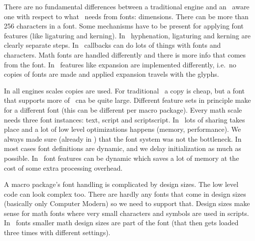 \stoptitle

\starttitle[title=\UNICODE\ engines]

\startitemize
    \startitem
        There are no fundamental differences between a traditional engine and an
        \UNICODE\ aware one with respect to what \TEX\ needs from fonts:
        dimensions.
    \stopitem
    \startitem
        There can be more than 256 characters in a font.
    \stopitem
    \startitem
        Some mechanisms have to be present for applying font features (like ligaturing and
        kerning).
    \stopitem
    \startitem
        In \LUATEX\ hyphenation, ligaturing and kerning are clearly separate steps.
    \stopitem
    \startitem
        In \LUATEX\ callbacks can do lots of things with fonts and characters.
    \stopitem
    \startitem
        Math fonts are handled differently and there is more info that comes from the font.
    \stopitem
    \startitem
        In \LUATEX\ features like expansion are implemented differently, i.e.\ no
        copies of fonts are made and applied expansion travels with the glyphs.
    \stopitem
\stopitemize

\stoptitle

\starttitle[title=Overhead]

\startitemize
    \startitem
        In all engines scales copies are used. For traditional \TEX\ a copy is cheap, but a
        font that supports more of \UNICODE\ cna be quite large.
    \stopitem
    \startitem
        Different feature sets in principle make for a different font (this can be different
        per macro package).
    \stopitem
    \startitem
        Every math scale needs three font instances: text, script and scriptscript.
    \stopitem
    \startitem
        In \CONTEXT\ lots of sharing takes place and a lot of low level
        optimizations happens (memory, performance). We always made sure (already
        in \MKII) that the font system was not the bottleneck.
    \stopitem
    \startitem
        In most cases font definitions are dynamic, and we delay initialization
        as much as possible.
    \stopitem
    \startitem
        In \MKIV\ font features can be dynamic which saves a lot of memory at the
        cost of some extra processing overhead.
    \stopitem
\stopitemize

\stoptitle

\starttitle[title=Design sizes]

\startitemize
    \startitem
        A macro package's font handling is complicated by design sizes. The low level
        code can look complex too.
    \stopitem
    \startitem
        There are hardly any fonts that come in design sizes (basically only Computer
        Modern) so we need to support that.
    \stopitem
    \startitem
        Design sizes make sense for math fonts where very small characters and
        symbols are used in scripts.
    \stopitem
    \startitem
        In \OPENTYPE\ fonts smaller math design sizes are part of the font (that
        then gets loaded three times with different  settings).
    \stopitem
\stopitemize


